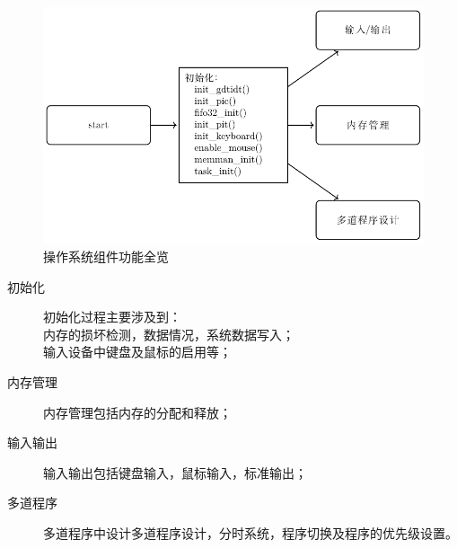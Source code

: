 \begin{figure}[H]
  \centering
  \includegraphics[width=.8\textwidth]{../Fig/func/run.pdf}
  \caption{操作系统组件功能全览}
  \label{fig:run}
\end{figure}

\begin{description}
  \item[初始化] 初始化过程主要涉及到：\\
  内存的损坏检测，数据情况，系统数据写入；\\
  输入设备中键盘及鼠标的启用等；
  \item[内存管理] 内存管理包括内存的分配和释放；
  \item[输入输出] 输入输出包括键盘输入，鼠标输入，标准输出；
  \item[多道程序] 多道程序中设计多道程序设计，分时系统，程序切换及程序的优先级设置。
\end{description}
